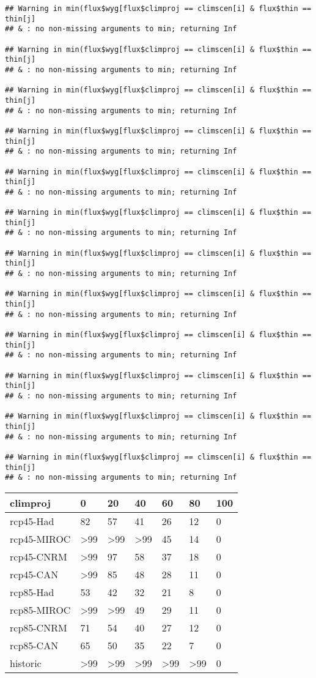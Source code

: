 \documentclass[]{article}
\begin{document}
\begin{verbatim}
## Warning in min(flux$wyg[flux$climproj == climscen[i] & flux$thin == thin[j]
## & : no non-missing arguments to min; returning Inf

## Warning in min(flux$wyg[flux$climproj == climscen[i] & flux$thin == thin[j]
## & : no non-missing arguments to min; returning Inf

## Warning in min(flux$wyg[flux$climproj == climscen[i] & flux$thin == thin[j]
## & : no non-missing arguments to min; returning Inf

## Warning in min(flux$wyg[flux$climproj == climscen[i] & flux$thin == thin[j]
## & : no non-missing arguments to min; returning Inf

## Warning in min(flux$wyg[flux$climproj == climscen[i] & flux$thin == thin[j]
## & : no non-missing arguments to min; returning Inf

## Warning in min(flux$wyg[flux$climproj == climscen[i] & flux$thin == thin[j]
## & : no non-missing arguments to min; returning Inf

## Warning in min(flux$wyg[flux$climproj == climscen[i] & flux$thin == thin[j]
## & : no non-missing arguments to min; returning Inf

## Warning in min(flux$wyg[flux$climproj == climscen[i] & flux$thin == thin[j]
## & : no non-missing arguments to min; returning Inf

## Warning in min(flux$wyg[flux$climproj == climscen[i] & flux$thin == thin[j]
## & : no non-missing arguments to min; returning Inf

## Warning in min(flux$wyg[flux$climproj == climscen[i] & flux$thin == thin[j]
## & : no non-missing arguments to min; returning Inf

## Warning in min(flux$wyg[flux$climproj == climscen[i] & flux$thin == thin[j]
## & : no non-missing arguments to min; returning Inf

## Warning in min(flux$wyg[flux$climproj == climscen[i] & flux$thin == thin[j]
## & : no non-missing arguments to min; returning Inf
\end{verbatim}

\begin{table}[H]
\centering
\begin{tabular}{l|l|l|l|l|l|l}
\hline
climproj & 0 & 20 & 40 & 60 & 80 & 100\\
\hline
rcp45-Had & 82 & 57 & 41 & 26 & 12 & 0\\
\hline
rcp45-MIROC & >99 & >99 & >99 & 45 & 14 & 0\\
\hline
rcp45-CNRM & >99 & 97 & 58 & 37 & 18 & 0\\
\hline
rcp45-CAN & >99 & 85 & 48 & 28 & 11 & 0\\
\hline
rcp85-Had & 53 & 42 & 32 & 21 & 8 & 0\\
\hline
rcp85-MIROC & >99 & >99 & 49 & 29 & 11 & 0\\
\hline
rcp85-CNRM & 71 & 54 & 40 & 27 & 12 & 0\\
\hline
rcp85-CAN & 65 & 50 & 35 & 22 & 7 & 0\\
\hline
historic & >99 & >99 & >99 & >99 & >99 & 0\\
\hline
\end{tabular}
\end{table}
\end{document}
